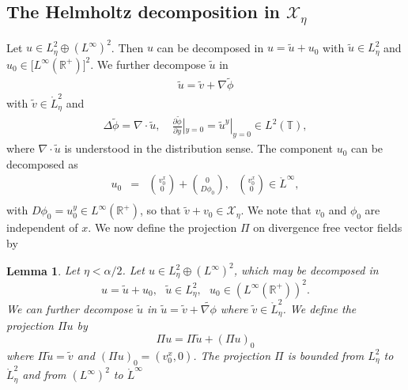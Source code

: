 \documentclass[11pt]{article}
\newtheorem{lemma}[theorem]{Lemma}
\begin{document}
\subsection{The Helmholtz decomposition in $\mathcal{X}_{\eta}$}




Let $u\in L_{\eta}^{2}\oplus (L^{\infty })^{2}$. Then $u$ can be decomposed in  
$u=\widetilde{u}+u_{0}$
with $\widetilde{u}\in L_{\eta}^{2}$ 
and $u_{0}\in \lbrack L^{\infty }(\mathbb{R}%
^{+})]^{2}$. We further decompose $\widetilde{u}$ in
\begin{eqnarray*}
\widetilde{u} = \widetilde{v}+\nabla \widetilde{\phi }
\end{eqnarray*}
with $\widetilde{v}\in \mathring{L}_{\eta}^{2}$ and
\begin{eqnarray*}
\Delta \widetilde{\phi } = \nabla \cdot \widetilde{u}, \quad 
\frac{\partial \widetilde{\phi }}{\partial y}|_{y=0}=\widetilde{u}^{y}|_{y=0}\in L^{2}(%
\mathbb{T}),
\end{eqnarray*}%
where $\nabla \cdot \widetilde{u}$ is understood in the distribution sense.
The component $u_{0}$ can be
decomposed as%
\begin{eqnarray*}
u_{0} &=&\binom{v_{0}^{x}}{0}+\binom{0}{D\phi _{0}},\text{ }\binom{v_{0}^{x}%
}{0}\in \mathring{L}^{\infty }, \\
\end{eqnarray*}%
with $D \phi_0 = u_0^y \in L^\infty(\mathbb{R}^+)$,
so that $\widetilde{v}+v_{0}\in \mathcal{X}_{\eta}$.  We note that $v_{0}$
and $\phi _{0}$ are independent of $x$. We now define the projection $\Pi$ on divergence free vector fields by 

\begin{lemma}
\label{lem:decomp Hk} Let $\eta < \alpha / 2$.
Let $u\in L_{\eta}^{2}\oplus (L^{\infty })^{2}$, which may be decomposed in  
\begin{equation*}
u=\widetilde{u}+u_{0},\text{ }\widetilde{u}\in L_{\eta}^{2},\text{ }u_{0}\in
(L^{\infty }(\mathbb{R}^{+}))^{2}.
\end{equation*}%
We can further decompose $\widetilde{u}$ in $\widetilde{u}=\widetilde{v}+\widetilde{\nabla \phi }$
where $\widetilde{v} \in \mathring{L}_{\eta}^{2}$.
We define the projection $\Pi u$ by 
\begin{equation*}
\Pi u=\Pi \widetilde{u}+(\Pi u)_{0}
\end{equation*}%
where $\Pi \widetilde{u} = \widetilde{v}$ and $(\Pi u)_0 = (v_0^x,0)$.
The projection $\Pi$ is bounded from $L_{\eta}^{2}$ to $\mathring{L}_{\eta}^{2}$
and from $(L^{\infty})^{2}$ to $\mathring{L}^{\infty }$
\end{lemma}
\end{document}
